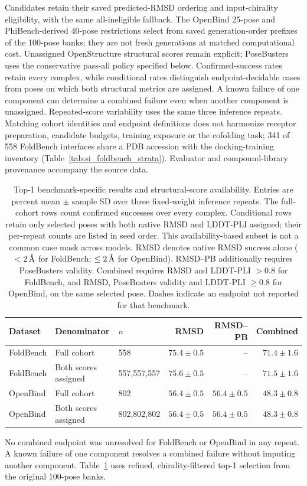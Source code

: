 \documentclass{article}
\newcommand{\angstrom}{\text{\normalfont\AA}}
\begin{document}
Candidates retain their saved predicted-RMSD ordering and input-chirality eligibility, with the same all-ineligible fallback. The OpenBind 25-pose and PhiBench-derived 40-pose restrictions select from saved generation-order prefixes of the 100-pose banks; they are not fresh generations at matched computational cost. Unassigned OpenStructure structural scores remain explicit; PoseBusters uses the conservative pass-all policy specified below. Confirmed-success rates retain every complex, while conditional rates distinguish endpoint-decidable cases from poses on which both structural metrics are assigned. A known failure of one component can determine a combined failure even when another component is unassigned. Repeated-score variability uses the same three inference repeats. Matching cohort identities and endpoint definitions does not harmonize receptor preparation, candidate budgets, training exposure or the cofolding task; 341 of 558 FoldBench interfaces share a PDB accession with the docking-training inventory (Table~\ref{tab:si_foldbench_strata}). Evaluator and compound-library provenance accompany the source data.

\begin{table}[!htbp]
\centering\small
\caption{Top-1 benchmark-specific results and structural-score availability. Entries are percent mean $\pm$ sample SD over three fixed-weight inference repeats. The full-cohort rows count confirmed successes over every complex. Conditional rows retain only selected poses with both native RMSD and LDDT-PLI assigned; their per-repeat counts are listed in seed order. This availability-based subset is not a common case mask across models. RMSD denotes native RMSD success alone ($<2\,\angstrom$ for FoldBench; $\le2\,\angstrom$ for OpenBind). RMSD--PB additionally requires PoseBusters validity. Combined requires RMSD and LDDT-PLI $>0.8$ for FoldBench, and RMSD, PoseBusters validity and LDDT-PLI $\ge0.8$ for OpenBind, on the same selected pose. Dashes indicate an endpoint not reported for that benchmark.}
\label{tab:si_native_scoreability}
\begin{tabularx}{\linewidth}{@{}lXlrrr@{}}
\toprule
Dataset & Denominator & $n$ & RMSD & RMSD--PB & Combined \\
\midrule
FoldBench & Full cohort & 558 & $75.4\pm0.5$ & -- & $71.4\pm1.6$ \\
FoldBench & Both scores assigned & 557,557,557 & $75.6\pm0.5$ & -- & $71.5\pm1.6$ \\
OpenBind & Full cohort & 802 & $56.4\pm0.5$ & $56.4\pm0.5$ & $48.3\pm0.8$ \\
OpenBind & Both scores assigned & 802,802,802 & $56.4\pm0.5$ & $56.4\pm0.5$ & $48.3\pm0.8$ \\
\bottomrule
\end{tabularx}
\end{table}
No combined endpoint was unresolved for FoldBench or OpenBind in any repeat. A known failure of one component resolves a combined failure without imputing another component. Table~\ref{tab:si_native_scoreability} uses refined, chirality-filtered top-1 selection from the original 100-pose banks.
\end{document}
